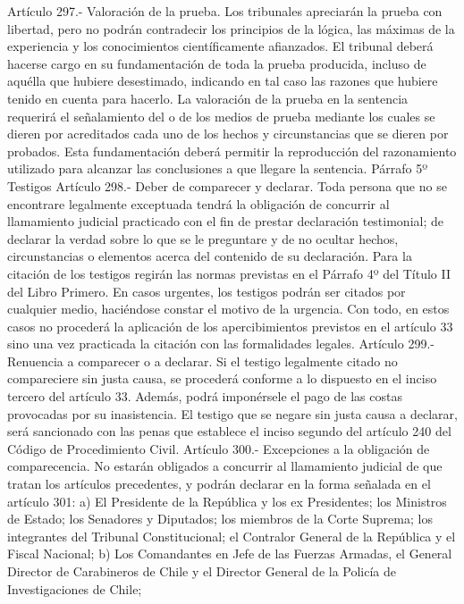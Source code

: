     Artículo 297.- Valoración de la prueba. Los tribunales apreciarán la prueba con libertad, pero no podrán contradecir los principios de la lógica, las máximas de la experiencia y los conocimientos científicamente afianzados.
    El tribunal deberá hacerse cargo en su fundamentación de toda la prueba producida, incluso de aquélla que hubiere desestimado, indicando en tal caso las razones que hubiere tenido en cuenta para hacerlo.
    La valoración de la prueba en la sentencia requerirá el señalamiento del o de los medios de prueba mediante los cuales se dieren por acreditados cada uno de los hechos y circunstancias que se dieren por probados. Esta fundamentación deberá permitir la reproducción del razonamiento utilizado para alcanzar las conclusiones a que llegare la sentencia.
    Párrafo 5º Testigos
    Artículo 298.- Deber de comparecer y declarar. Toda persona que no se encontrare legalmente exceptuada tendrá la obligación de concurrir al llamamiento judicial practicado con el fin de prestar declaración testimonial; de declarar la verdad sobre lo que se le preguntare y de no ocultar hechos, circunstancias o elementos acerca del contenido de su declaración.
    Para la citación de los testigos regirán las normas previstas en el Párrafo 4º del Título II del Libro Primero.
    En casos urgentes, los testigos podrán ser citados por cualquier medio, haciéndose constar el motivo de la urgencia. Con todo, en estos casos no procederá la aplicación de los apercibimientos previstos en el artículo 33 sino una vez practicada la citación con las formalidades legales.
    Artículo 299.- Renuencia a comparecer o a declarar. Si el testigo legalmente citado no compareciere sin justa causa, se procederá conforme a lo dispuesto en el inciso tercero del artículo 33. Además, podrá imponérsele el pago de las costas provocadas por su inasistencia.
    El testigo que se negare sin justa causa a declarar, será sancionado con las penas que establece el inciso segundo del artículo 240 del Código de Procedimiento Civil.
    Artículo 300.- Excepciones a la obligación de comparecencia. No estarán obligados a concurrir al llamamiento judicial de que tratan los artículos precedentes, y podrán declarar en la forma señalada en el artículo 301:
    a) El Presidente de la República y los ex Presidentes; los Ministros de Estado; los Senadores y Diputados; los miembros de la Corte Suprema; los integrantes del Tribunal Constitucional; el Contralor General de la República y el Fiscal Nacional;
    b) Los Comandantes en Jefe de las Fuerzas Armadas, el General Director de Carabineros de Chile y el Director General de la Policía de Investigaciones de Chile;
